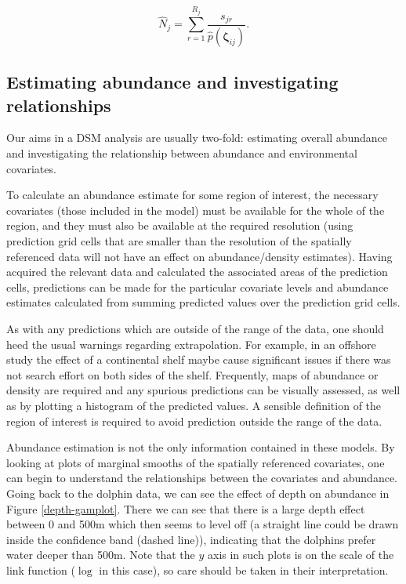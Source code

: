 \documentclass[a4paper,12pt]{article}
\begin{document}
\begin{equation*}
\hat{N}_j = \sum_{r=1}^{R_j} \frac{s_{jr}}{\hat{p}(\bm{\zeta}_{ij})}.
\end{equation*}



\subsection*{Estimating abundance and investigating relationships}

Our aims in a DSM analysis are usually two-fold: estimating overall abundance and investigating the relationship between abundance and environmental covariates.

To calculate an abundance estimate for some region of interest, the necessary covariates (those included in the model) must be available for the whole of the region, and they must also be available at the required resolution (using prediction grid cells that are smaller than the resolution of the spatially referenced data will not have an effect on abundance/density estimates). Having acquired the relevant data and calculated the associated areas of the prediction cells, predictions can be made for the particular covariate levels and abundance estimates calculated from summing predicted values over the prediction grid cells. 

As with any predictions which are outside of the range of the data, one should heed the usual warnings regarding extrapolation. For example, in an offshore study the effect of a continental shelf maybe cause significant issues if there was not search effort on both sides of the shelf. Frequently,  maps of abundance or density are required and any spurious predictions can be visually assessed, as well as by plotting a histogram of the predicted values. A sensible definition of the region of interest is required to avoid prediction outside the range of the data.

Abundance estimation is not the only information contained in these models. By looking at plots of marginal smooths of the spatially referenced covariates, one can begin to understand the relationships between the covariates and abundance. Going back to the dolphin data, we can see the effect of depth on abundance in Figure \ref{depth-gamplot}. There we can see that there is a large depth effect between 0 and 500m which then seems to level off (a straight line could be drawn inside the confidence band (dashed line)), indicating that the dolphins prefer water deeper than 500m. Note that the $y$ axis in such plots is on the scale of the link function ($\log$ in this case), so care should be taken in their interpretation.
\end{document}

